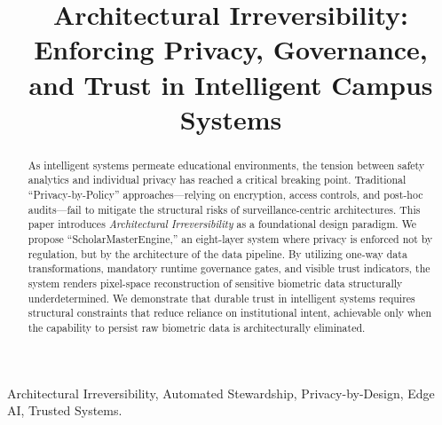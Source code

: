\documentclass[conference]{IEEEtran}
\begin{document}
\title{Architectural Irreversibility: Enforcing Privacy, Governance, and Trust in Intelligent Campus Systems}

\author{
}

\maketitle

\begin{abstract}
As intelligent systems permeate educational environments, the tension between safety analytics and individual privacy has reached a critical breaking point. Traditional ``Privacy-by-Policy'' approaches---relying on encryption, access controls, and post-hoc audits---fail to mitigate the structural risks of surveillance-centric architectures. This paper introduces \textit{Architectural Irreversibility} as a foundational design paradigm. We propose ``ScholarMasterEngine,'' an eight-layer system where privacy is enforced not by regulation, but by the architecture of the data pipeline. By utilizing one-way data transformations, mandatory runtime governance gates, and visible trust indicators, the system renders pixel-space reconstruction of sensitive biometric data structurally underdetermined. We demonstrate that durable trust in intelligent systems requires structural constraints that reduce reliance on institutional intent, achievable only when the capability to persist raw biometric data is architecturally eliminated.
\end{abstract}

\begin{IEEEkeywords}
Architectural Irreversibility, Automated Stewardship, Privacy-by-Design, Edge AI, Trusted Systems.
\end{IEEEkeywords}

\end{document}
